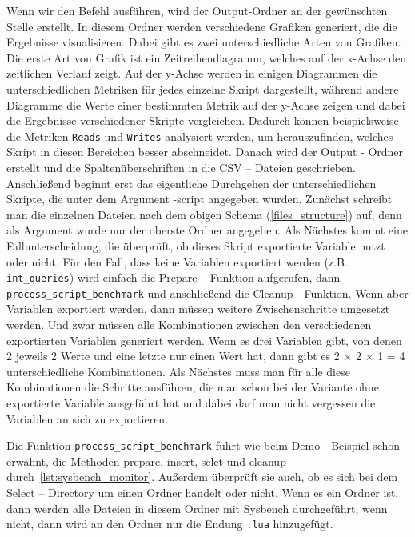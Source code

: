 Wenn wir den Befehl ausführen, wird der Output-Ordner an der gewünschten Stelle erstellt.
In diesem Ordner werden verschiedene Grafiken generiert, die die Ergebnisse visualisieren.
Dabei gibt es zwei unterschiedliche Arten von Grafiken.
Die erste Art von Grafik ist ein Zeitreihendiagramm, welches auf der x-Achse den zeitlichen Verlauf zeigt.
Auf der y-Achse werden in einigen Diagrammen die unterschiedlichen Metriken für jedes einzelne Skript dargestellt, während andere Diagramme die Werte einer bestimmten Metrik auf der y-Achse zeigen und dabei die Ergebnisse verschiedener Skripte vergleichen.
Dadurch können beispielsweise die Metriken \texttt{Reads} und \texttt{Writes} analysiert werden, um herauszufinden, welches Skript in diesen Bereichen besser abschneidet.
Danach wird der Output - Ordner erstellt und die Spaltenüberschriften in die CSV – Dateien geschrieben.
Anschließend beginnt erst das eigentliche Durchgehen der unterschiedlichen Skripte, die unter dem Argument -script angegeben wurden.
Zunächst schreibt man die einzelnen Dateien nach dem obigen Schema (\ref{files_structure}) auf, denn als Argument wurde nur der oberste Ordner angegeben.
Als Nächstes kommt eine Fallunterscheidung, die überprüft, ob dieses Skript exportierte Variable nutzt oder nicht.
Für den Fall, dass keine Variablen exportiert werden (z.B. \texttt{int\_queries}) wird einfach die Prepare – Funktion aufgerufen, dann \texttt{process\_script\_benchmark} und anschließend die Cleanup - Funktion.
Wenn aber Variablen exportiert werden, dann müssen weitere Zwischenschritte umgesetzt werden.
Und zwar müssen alle Kombinationen zwischen den verschiedenen exportierten Variablen generiert werden.
Wenn es drei Variablen gibt, von denen 2 jeweils 2 Werte und eine letzte nur einen Wert hat, dann gibt es 2 × 2 × 1 = 4 unterschiedliche Kombinationen.
Als Nächstes muss man für alle diese Kombinationen die Schritte ausführen, die man schon bei der Variante ohne exportierte Variable ausgeführt hat und dabei darf man nicht vergessen die Variablen an sich zu exportieren.



Die Funktion \texttt{process\_script\_benchmark} führt wie beim Demo - Beispiel schon erwähnt, die Methoden prepare, insert, selct und cleanup durch~\ref{lst:sysbench_monitor}.
Außerdem überprüft sie auch, ob es sich bei dem Select – Directory um einen Ordner handelt oder nicht.
Wenn es ein Ordner ist, dann werden alle Dateien in diesem Ordner mit Sysbench durchgeführt, wenn nicht, dann wird an den Ordner nur die Endung \texttt{.lua} hinzugefügt.

